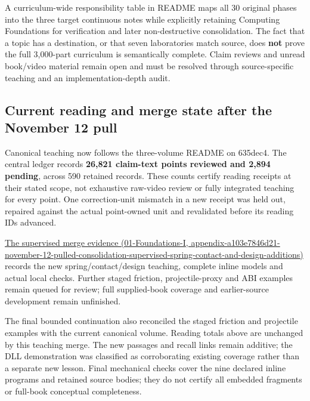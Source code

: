 A curriculum-wide responsibility table in README maps all 30 original phases into the three target continuous notes while explicitly retaining Computing Foundations for verification and later non-destructive consolidation. The fact that a topic has a destination, or that seven laboratories match source, does \textbf{not} prove the full 3,000-part curriculum is semantically complete. Claim reviews and unread book/video material remain open and must be resolved through source-specific teaching and an implementation-depth audit.

\subsection{Current reading and merge state after the November 12 pull}\label{appendix-3b67654799a2-current-reading-and-merge-state-after-the-november-12-pull}

Canonical teaching now follows the three-volume README on 635dec4. The central ledger records \textbf{26,821 claim-text points reviewed and 2,894 pending}, across 590 retained records. These counts certify reading receipts at their stated scope, not exhaustive raw-video review or fully integrated teaching for every point. One correction-unit mismatch in a new receipt was held out, repaired against the actual point-owned unit and revalidated before its reading IDs advanced.

\href{../01-Foundations-I/main.pdf\#nameddest=appendix-a103e7846d21-november-12-pulled-consolidation-supervised-spring-contact-and-design-additions}{The supervised merge evidence (01-Foundations-I, appendix-a103e7846d21-november-12-pulled-consolidation-supervised-spring-contact-and-design-additions)} records the new spring/contact/design teaching, complete inline models and actual local checks. Further staged friction, projectile-proxy and ABI examples remain queued for review; full supplied-book coverage and earlier-source development remain unfinished.

The final bounded continuation also reconciled the staged friction and projectile examples with the current canonical volume. Reading totals above are unchanged by this teaching merge. The new passages and recall links remain additive; the DLL demonstration was classified as corroborating existing coverage rather than a separate new lesson. Final mechanical checks cover the nine declared inline programs and retained source bodies; they do not certify all embedded fragments or full-book conceptual completeness.

